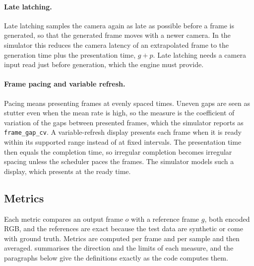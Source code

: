 \paragraph{Late latching.} Late latching samples the camera again as late as possible before a frame is generated, so that the generated frame moves with a newer camera. In the simulator this reduces the camera latency of an extrapolated frame to the generation time plus the presentation time, $g+p$. Late latching needs a camera input read just before generation, which the engine must provide.

\paragraph{Frame pacing and variable refresh.} Pacing means presenting frames at evenly spaced times. Uneven gaps are seen as stutter even when the mean rate is high, so the measure is the coefficient of variation of the gaps between presented frames, which the simulator reports as \texttt{frame\_gap\_cv}. A variable-refresh display presents each frame when it is ready within its supported range instead of at fixed intervals. The presentation time then equals the completion time, so irregular completion becomes irregular spacing unless the scheduler paces the frames. The simulator models such a display, which presents at the ready time.

\subsection{Metrics}\label{sec:bg-metrics}

Each metric compares an output frame $o$ with a reference frame $g$, both encoded RGB, and the references are exact because the test data are synthetic or come with ground truth. Metrics are computed per frame and per sample and then averaged.  summarises the direction and the limits of each measure, and the paragraphs below give the definitions exactly as the code computes them.

